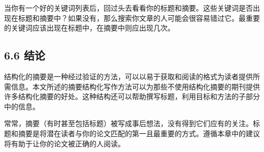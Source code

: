 当你有一个好的关键词列表后，回过头去看看你的标题和摘要。这些关键词是否出现在标题和摘要中？如果没有，那么搜索你文章的人可能会很容易错过它。最重要的关键词应该出现在标题中，在摘要中则应出现几次。

\subsection*{6.6 结论}
结构化的摘要是一种经过验证的方法，可以以易于获取和阅读的格式为读者提供所需信息。本文所述的摘要结构化写作方法可以为那些不使用结构化摘要的期刊提供许多结构化摘要的好处。这种结构还可以帮助撰写标题，利用目标和方法的子部分中的信息。

常常，摘要（有时甚至包括标题）被写成事后想法，没有得到它们应有的关注。标题和摘要是将潜在读者与你的论文匹配的第一且最重要的方式。遵循本章中的建议将有助于让你的论文被正确的人阅读。

